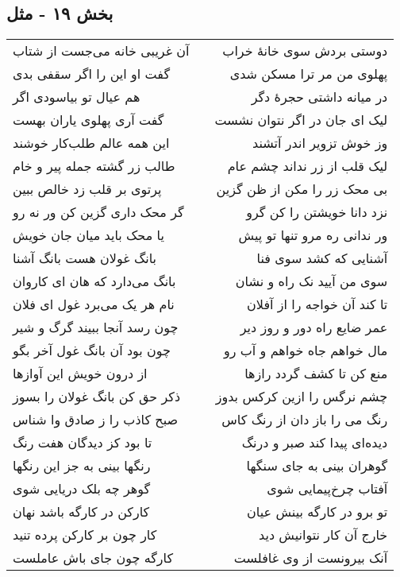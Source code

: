 \begin{center}
\section*{بخش ۱۹ - مثل}
\label{sec:sh019}
\begin{longtable}{l p{0.5cm} r}
آن غریبی خانه می‌جست از شتاب
&&
دوستی بردش سوی خانهٔ خراب
\\
گفت او این را اگر سقفی بدی
&&
پهلوی من مر ترا مسکن شدی
\\
هم عیال تو بیاسودی اگر
&&
در میانه داشتی حجرهٔ دگر
\\
گفت آری پهلوی یاران بهست
&&
لیک ای جان در اگر نتوان نشست
\\
این همه عالم طلب‌کار خوشند
&&
وز خوش تزویر اندر آتشند
\\
طالب زر گشته جمله پیر و خام
&&
لیک قلب از زر نداند چشم عام
\\
پرتوی بر قلب زد خالص ببین
&&
بی محک زر را مکن از ظن گزین
\\
گر محک داری گزین کن ور نه رو
&&
نزد دانا خویشتن را کن گرو
\\
یا محک باید میان جان خویش
&&
ور ندانی ره مرو تنها تو پیش
\\
بانگ غولان هست بانگ آشنا
&&
آشنایی که کشد سوی فنا
\\
بانگ می‌دارد که هان ای کاروان
&&
سوی من آیید نک راه و نشان
\\
نام هر یک می‌برد غول ای فلان
&&
تا کند آن خواجه را از آفلان
\\
چون رسد آنجا ببیند گرگ و شیر
&&
عمر ضایع راه دور و روز دیر
\\
چون بود آن بانگ غول آخر بگو
&&
مال خواهم جاه خواهم و آب رو
\\
از درون خویش این آوازها
&&
منع کن تا کشف گردد رازها
\\
ذکر حق کن بانگ غولان را بسوز
&&
چشم نرگس را ازین کرکس بدوز
\\
صبح کاذب را ز صادق وا شناس
&&
رنگ می را باز دان از رنگ کاس
\\
تا بود کز دیدگان هفت رنگ
&&
دیده‌ای پیدا کند صبر و درنگ
\\
رنگها بینی به جز این رنگها
&&
گوهران بینی به جای سنگها
\\
گوهر چه بلک دریایی شوی
&&
آفتاب چرخ‌پیمایی شوی
\\
کارکن در کارگه باشد نهان
&&
تو برو در کارگه بینش عیان
\\
کار چون بر کارکن پرده تنید
&&
خارج آن کار نتوانیش دید
\\
کارگه چون جای باش عاملست
&&
آنک بیرونست از وی غافلست

\end{longtable}
\end{center}
